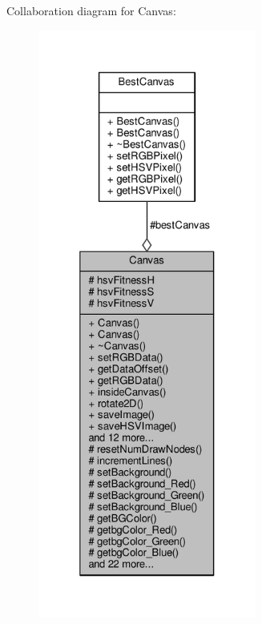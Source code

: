 Collaboration diagram for Canvas\+:
\nopagebreak
\begin{figure}[H]
\begin{center}
\leavevmode
\includegraphics[height=550pt]{classCanvas__coll__graph}
\end{center}
\end{figure}
